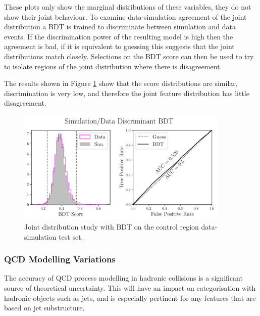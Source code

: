 These plots only show the marginal distributions of these variables, they do not show their joint behaviour. 
To examine data-simulation agreement of the joint distribution a BDT is trained to discriminate between simulation and data events. 
If the discrimination power of the resulting model is high then the agreement is bad, if it is equivalent to guessing this suggests that the joint distributions match closely. 
Selections on the BDT score can then be used to try to isolate regions of the joint distribution where there is disagreement. 

The results shown in Figure \ref{fig:event_categorisation:zee_bdt_validation} show that the score distributions are similar, discrimination is very low, and therefore the joint feature distribution has little disagreement.
\begin{figure}[h!]
    \begin{center}
    \includegraphics[width=0.9\textwidth]{figures/event_selection/eng_feature_ROC_Zee_BDT.pdf}
    \end{center}
    \caption{Joint distribution study with BDT on the \Zee control region data-simulation test set.}
    \label{fig:event_categorisation:zee_bdt_validation}
\end{figure}


\subsubsection{QCD Modelling Variations}
The accuracy of QCD process modelling in hadronic collisions is a significant source of theoretical uncertainty. 
This will have an impact on categorisation with hadronic objects such as jets, and is especially pertinent for any features that are based on jet substructure. 

